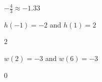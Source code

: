 \begin{solution}
    $-\frac{4}{3}\approx-1.33$
\end{solution}

\begin{exercise}
$h(-1)=-2$ and $h(1)=2$
\end{exercise}

\begin{solution}
    $2$
\end{solution}

\begin{exercise}\label{exercise-2.1.14}
$w(2)=-3$ and $w(6)=-3$
\end{exercise}

\begin{solution}
    $0$
\end{solution}






